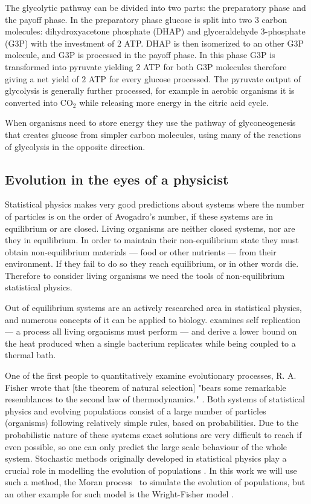 \documentclass[a4paper,12pt]{article}
\begin{document}
The glycolytic pathway can be divided into two parts: the preparatory phase and the payoff phase. In the preparatory phase glucose is split into two $3$ carbon molecules: dihydroxyacetone phosphate (DHAP) and glyceraldehyde 3-phosphate (G3P) with the investment of $2$ ATP. DHAP is then isomerized to an other G3P molecule, and G3P is processed in the payoff phase. In this phase G3P is transformed into pyruvate yielding $2$ ATP for both G3P molecules therefore giving a net yield of $2$ ATP for every glucose processed. The pyruvate output of glycolysis is generally further processed, for example in aerobic organisms it is converted into CO$_2$ while releasing more energy in the citric acid cycle. 

When organisms need to store energy they use the pathway of glyconeogenesis that creates glucose from simpler carbon molecules, using many of the reactions of glycolysis in the opposite direction. %
	\subsection{Evolution in the eyes of a physicist}\label{chap:whereisphysics}

	Statistical physics makes very good predictions about systems where the number of particles is on the order of Avogadro's number, if these systems are in equilibrium or are closed. Living organisms are neither closed systems, nor are they in equilibrium. In order to maintain their non-equilibrium state they must obtain non-equilibrium materials --- food or other nutrients --- from their environment. If they fail to do so they reach equilibrium, or in other words die. \cite{irreversibility} Therefore to consider living organisms we need the tools of non-equilibrium statistical physics. 

	Out of equilibrium systems are an actively researched area in statistical physics, and numerous concepts of it can be applied to biology. \cite{selfreplication} examines self replication --- a process all living organisms must perform --- and derive a lower bound on the heat produced when a single bacterium replicates while being coupled to a thermal bath. 
	
	One of the first people to quantitatively examine evolutionary processes, R. A. Fisher wrote that [the theorem of natural selection] "bears some remarkable resemblances to the second law of thermodynamics." \cite{fisherevolution}. Both systems of statistical physics and evolving populations consist of a large number of particles (organisms) following relatively simple rules, based on probabilities. Due to the probabilistic nature of these systems exact solutions are very difficult to reach if even possible, so one can only predict the large scale behaviour of the whole system. Stochastic methods originally developed in statistical physics play a crucial role in modelling the evolution of populations \cite{stochasticblythe}. In this work we will use such a method, the Moran process \cite{moranprocess}~to simulate the evolution of populations, but an other example for such model is the Wright-Fisher model \cite{mathematicalpopgen}.
\end{document}

